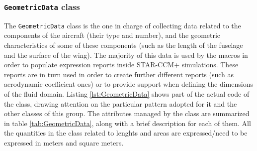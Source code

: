 \subsubsection{\texttt{GeometricData} class}

The \lstinline[language=Java]!GeometricData! class is the one in charge of collecting data related to the components of the aircraft (their type and number), and the geometric characteristics of some of these components (such as the length of the fuselage and the surface of the wing). The majority of this data is used by the macros in order to populate expression reports inside STAR-CCM+ simulations. These reports are in turn used in order to create further different reports (such as aerodynamic coefficient ones) or to provide support when defining the dimensions of the fluid domain. Listing \ref{lst:GeometricData} shows part of the actual code of the class, drawing attention on the particular pattern adopted for it and the other classes of this group. The attributes managed by the class are summarized in table \ref{tab:GeometricData}, along with a brief description for each of them. All the quantities in the class related to lenghts and areas are expressed/need to be expressed in meters and square meters.
%
\bigskip
\begingroup
